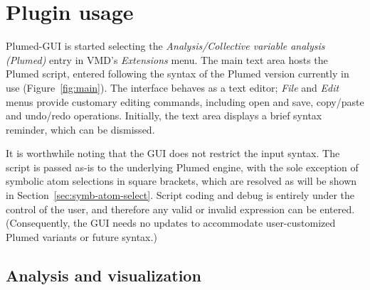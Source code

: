 \documentclass[preprint,review,11pt]{elsarticle}
\begin{document}





\section{Plugin usage}

Plumed-GUI is started selecting the \emph{Analysis/Collective variable
  analysis (Plumed)} entry in VMD's \emph{Extensions} menu. The main
text area hosts the Plumed script, entered following the syntax of the
Plumed version currently in use (Figure~\ref{fig:main}).  The
interface behaves as a text editor; \emph{File} and \emph{Edit} menus
provide customary editing commands, including open and save,
copy/paste and undo/redo operations.  Initially, the text area
displays a brief syntax reminder, which can be dismissed.


It is worthwhile noting that the GUI does not restrict the input
syntax. The script is passed as-is to the underlying Plumed engine,
with the sole exception of symbolic atom selections in square
brackets, which are resolved as will be shown in
Section~\ref{sec:symb-atom-select}.  Script coding and debug is
entirely under the control of the user, and therefore any valid or
invalid expression can be entered.  (Consequently, the GUI needs no
updates to accommodate user-customized Plumed variants or future
syntax.)




\subsection{Analysis and visualization}
\end{document}
